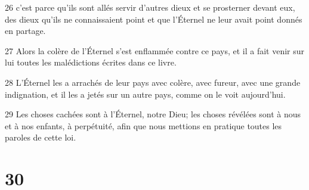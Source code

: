 \par 26 c'est parce qu'ils sont allés servir d'autres dieux et se prosterner devant eux, des dieux qu'ils ne connaissaient point et que l'Éternel ne leur avait point donnés en partage.
\par 27 Alors la colère de l'Éternel s'est enflammée contre ce pays, et il a fait venir sur lui toutes les malédictions écrites dans ce livre.
\par 28 L'Éternel les a arrachés de leur pays avec colère, avec fureur, avec une grande indignation, et il les a jetés sur un autre pays, comme on le voit aujourd'hui.
\par 29 Les choses cachées sont à l'Éternel, notre Dieu; les choses révélées sont à nous et à nos enfants, à perpétuité, afin que nous mettions en pratique toutes les paroles de cette loi.

\chapter{30}

